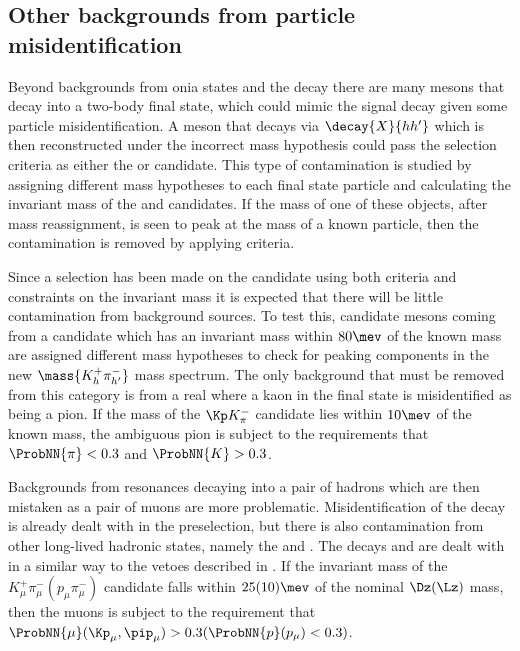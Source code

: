 \subsection{Other backgrounds from particle misidentification}
\label{sec:db:backgrounds:misid}

Beyond backgrounds from onia states and the \KS decay there are many mesons that decay into a
two-body final state, which could mimic the signal decay given some particle misidentification.
A meson that decays via $\decay{X}{hh^\prime}$ which is then reconstructed
under the incorrect mass hypothesis could pass the selection criteria as either the \db or \Kstarz
candidate.
This type of contamination is studied by assigning different mass hypotheses to each final state
particle and calculating the invariant mass of the \mumu and \kpi candidates.
If the mass of one of these objects, after mass reassignment, is seen to peak at the mass of a
known particle, then the contamination is removed by applying \pid criteria.

Since a selection has been made on the \decay{\Kstarz}{\kpi} candidate using both \pid criteria and
constraints on the \kpi invariant mass it is expected that there will be little contamination
from background sources.
To test this, candidate \Kstarz mesons coming from a \Bd candidate which has an invariant mass
within $80\mev$ of the known \Bd mass are assigned different mass hypotheses to check for peaking
components in the new $\mass{K_{h}^+\pi_{h^\prime}^-}$ mass spectrum.
The only background that must be removed from this category is from a real \decay{\phi}{\kk}
where a kaon in the final state is misidentified as being a pion.
If the mass of the $\Kp K^-_\pi$ candidate lies within $10\mev$ of the known \phii mass, the
ambiguous pion is subject to the requirements that
$\ProbNN{\pi}<0.3$ and $\ProbNN{K}>0.3$.

Backgrounds from resonances decaying into a pair of hadrons which are then mistaken as a pair of
muons are more problematic.
Misidentification of the decay \decay{\KS}{\pipi} is already dealt with in the preselection, but
there is also contamination from other long-lived hadronic states, namely the \Dz and \Lz.
The decays \decay{\Dz}{\kpi} and  are dealt with in a similar way to the vetoes
described in .
If the invariant mass of the $K^+_\mu\pi^-_\mu(p_\mu\pi^-_\mu)$ candidate falls within $25(10)\mev$
of the nominal $\Dz(\Lz)$ mass, then the muons is subject to the requirement that
$\ProbNN{\mu}(\Kp_\mu,\pip_\mu)>0.3(\ProbNN{p}(p_\mu)<0.3)$.


